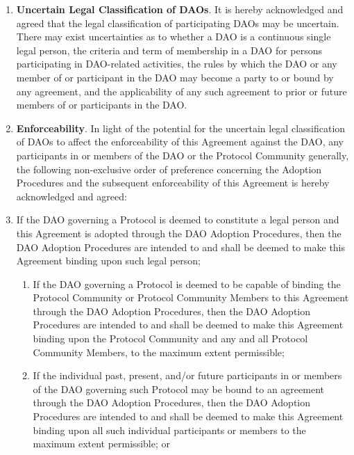 \documentclass{article}
\begin{document}
\begin{enumerate}
    \item \textbf{Uncertain Legal Classification of DAOs}. It is hereby acknowledged and agreed that the legal classification of participating DAOs may be uncertain. There may exist uncertainties as to whether a DAO is a continuous single legal person, the criteria and term of membership in a DAO for persons participating in DAO-related activities, the rules by which the DAO or any member of or participant in the DAO may become a party to or bound by any agreement, and the applicability of any such agreement to prior or future members of or participants in the DAO.

    \item \textbf{Enforceability}. In light of the potential for the uncertain legal classification of DAOs to affect the enforceability of this Agreement against the DAO, any participants in or members of the DAO or the Protocol Community generally, the following non-exclusive order of preference concerning the Adoption Procedures and the subsequent enforceability of this Agreement is hereby acknowledged and agreed:

    \item If the DAO governing a Protocol is deemed to constitute a legal person and this Agreement is adopted through the DAO Adoption Procedures, then the DAO Adoption Procedures are intended to and shall be deemed to make this Agreement binding upon such legal person;

          \begin{enumerate}

              \item If the DAO governing a Protocol is deemed to be capable of binding the Protocol Community or Protocol Community Members to this Agreement through the DAO Adoption Procedures, then the DAO Adoption Procedures are intended to and shall be deemed to make this Agreement binding upon the Protocol Community and any and all Protocol Community Members, to the maximum extent permissible;

              \item If the individual past, present, and/or future participants in or members of the DAO governing such Protocol may be bound to an agreement through the DAO Adoption Procedures, then the DAO Adoption Procedures are intended to and shall be deemed to make this Agreement binding upon all such individual participants or members to the maximum extent permissible; or


\end{enumerate}
\end{enumerate}
\end{document}

